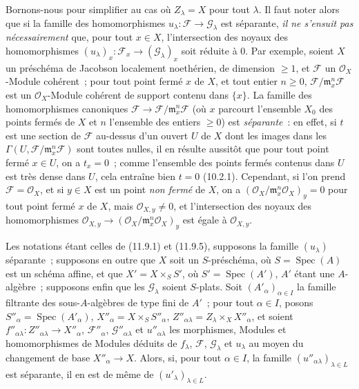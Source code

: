 \begin{remark}[11.9.11]
\label{IV.11.9.11-fr}
Bornons-nous pour simplifier au cas où $Z_\lambda=X$ pour tout $\lambda$. Il
faut noter alors que si la famille des homomorphismes
$u_\lambda:\mathcal F\to\mathcal G_\lambda$ est séparante, \emph{il ne
s'ensuit pas nécessairement} que, pour tout $x\in X$, l'intersection des
noyaux des homomorphismes
$(u_\lambda)_x:\mathcal F_x\to(\mathcal G_\lambda)_x$ soit réduite à 0. Par
exemple, soient $X$ un préschéma de Jacobson localement noethérien, de
dimension $\geq1$, et $\mathcal F$ un $\mathcal O_X$-Module cohérent~; pour
tout point fermé $x$ de $X$, et tout entier $n\geq0$,
$\mathcal F/\mathfrak m_x^n\mathcal F$ est un $\mathcal O_X$-Module cohérent de support
contenu dans $\{x\}$. La famille des homomorphismes canoniques
$\mathcal F\to\mathcal F/\mathfrak m_x^n\mathcal F$ (où $x$ parcourt
l'ensemble $X_0$ des points fermés de $X$ et $n$ l'ensemble des entiers
$\geq0$) est \emph{séparante}~: en effet, si $t$ est une section de
$\mathcal F$ au-dessus d'un ouvert $U$ de $X$ dont les images dans les
$\Gamma(U,\mathcal F/\mathfrak m_x^n\mathcal F)$ sont toutes nulles, il en
résulte aussitôt que pour tout point fermé $x\in U$, on a $t_x=0$~; comme
l'ensemble des points fermés contenus dans $U$ est très dense dans $U$, cela
entraîne bien $t=0$ (10.2.1). Cependant, si l'on prend
$\mathcal F=\mathcal O_X$, et si $y\in X$ est un point \emph{non fermé} de
$X$, on a $(\mathcal O_X/\mathfrak m_x^n\mathcal O_X)_y=0$ pour tout point
fermé $x$ de $X$, mais $\mathcal O_{X,y}\neq0$, et l'intersection des noyaux
des homomorphismes
$\mathcal O_{X,y}\to(\mathcal O_X/\mathfrak m_x^n\mathcal O_X)_y$ est égale
à $\mathcal O_{X,y}$.
\end{remark}

\begin{lemma}[11.9.12]
\label{IV.11.9.12-fr}
Les notations étant celles de \textup{(11.9.1)} et \textup{(11.9.5)}, supposons la famille
$(u_\lambda)$ séparante~; supposons en outre que $X$ soit un $S$-préschéma, où
$S=\operatorname{Spec}(A)$ est un schéma affine, et que
$X'=X\times_S S'$, où $S'=\operatorname{Spec}(A')$, $A'$ étant une
$A$-algèbre~; supposons enfin que les $\mathcal G_\lambda$ soient $S$-\textup{plats}.
Soit $(A'_\alpha)_{\alpha\in I}$ la famille filtrante des sous-$A$-algèbres de
type fini de $A'$~; pour tout $\alpha\in I$, posons
$S''_\alpha=\operatorname{Spec}(A'_\alpha)$,
$X''_\alpha=X\times_S S''_\alpha$,
$Z''_{\alpha\lambda}=Z_\lambda\times_X X''_\alpha$, et soient
$f''_{\alpha\lambda}:Z''_{\alpha\lambda}\to X''_\alpha$,
$\mathcal F''_\alpha$, $\mathcal G''_{\alpha\lambda}$ et
$u''_{\alpha\lambda}$ les morphismes, Modules et homomorphismes de Modules
déduits de $f_\lambda$, $\mathcal F$, $\mathcal G_\lambda$ et $u_\lambda$ au
moyen du changement de base $X''_\alpha\to X$. Alors, si, pour tout
$\alpha\in I$, la famille $(u''_{\alpha\lambda})_{\lambda\in L}$ est
séparante, il en est de même de $(u'_\lambda)_{\lambda\in L}$.
\end{lemma}

